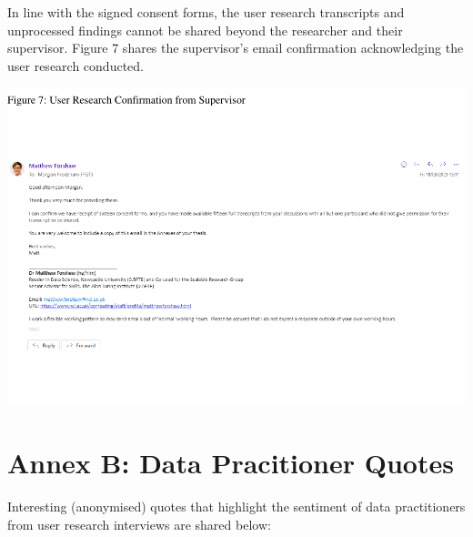 \documentclass{article}
\begin{document}
In line with the signed consent forms, the user research transcripts and
unprocessed findings cannot be shared beyond the researcher and their
supervisor. Figure 7 shares the supervisor's email confirmation
acknowledging the user research conducted.

\includegraphics[width=1\linewidth]{210431461_CSC8639_Dissertation_files/figure-latex/unnamed-chunk-3-1}
\newpage

\hypertarget{annex-b-data-pracitioner-quotes}{%
\section{Annex B: Data Pracitioner
Quotes}\label{annex-b-data-pracitioner-quotes}}

Interesting (anonymised) quotes that highlight the sentiment of data
practitioners from user research interviews are shared below:
\end{document}
